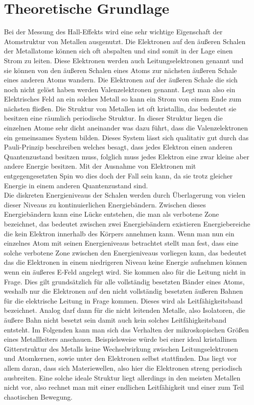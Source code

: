 \section{Theoretische Grundlage}
\label{sec:theo}
Bei der Messung des Hall-Effekts wird eine sehr wichtige Eigenschaft der Atomstruktur von Metallen ausgenutzt. %
Die Elektronen auf den äußeren Schalen der Metallatome können sich oft abspalten und sind somit in der Lage
einen Strom zu leiten. Diese Elektronen werden auch Leitungselektronen genannt und sie können von den äußeren Schalen
eines Atoms zur nächsten äußeren Schale eines anderen Atoms wandern. Die Elektronen auf der äußeren Schale die sich noch nicht gelöst haben werden Valenzelektronen
genannt. Legt man also ein Elektrisches Feld an ein solches Metall so kann ein Strom von einem Ende zum nächsten fließen.
Die Struktur von Metallen ist oft kristallin, das bedeutet sie besitzen eine räumlich periodische Struktur. In dieser Struktur liegen die einzelnen Atome sehr dicht aneinander 
was dazu führt, dass die Valenzelektronen ein gemeinsames System bilden. Dieses System lässt sich qualitativ gut durch das Pauli-Prinzip beschreiben welches besagt, dass
jedes Elektron einen anderen Quantenzustand besitzen muss, folglich muss jedes Elektron eine zwar kleine aber andere Energie besitzen. Mit der Ausnahme von Elektronen
mit entgegengesetzten Spin wo dies doch der Fall sein kann, da sie trotz gleicher Energie in einem anderen Quantenzustand sind. \\
Die diskreten Energieniveaus der Schalen werden durch Überlagerung von vielen dieser Niveaus zu kontinuierlichen Energiebändern. Zwischen dieses Energiebändern kann eine Lücke entstehen, die man 
als verbotene Zone bezeichnet, das bedeutet zwischen zwei Energiebändern existieren Energiebereiche die kein Elektron innerhalb des Körpers annehmen kann.
Wenn man nun ein einzelnes Atom mit seinen Energieniveaus betrachtet stellt man fest, dass eine solche verbotene Zone zwischen den Energieniveaus vorliegen kann, das bedeutet
das die Elektronen in einem niedrigeren Niveau keine Energie aufnehmen können wenn ein äußeres E-Feld angelegt wird. Sie kommen also für die Leitung nicht in Frage. 
Dies gilt grundsätzlich für alle vollständig besetzten Bänder eines Atoms, weshalb nur die Elektronen auf den nicht vollständig
besetzten äußeren Bahnen für die elektrische Leitung in Frage kommen. Dieses wird als Leitfähigkeitsband bezeichnet.
Analog darf dann für die nicht leitenden Metalle, also Isolatoren, die äußere Bahn nicht besetzt sein damit auch kein solches Leitfähigkeitsband entsteht.
Im Folgenden kann man sich das Verhalten der mikroskopischen Größen eines Metallleiters anschauen.
Beispielsweise würde bei einer ideal kristallinen Gitterstruktur des Metalls keine Wechselwirkung zwischen Leitungselektronen und Atomkernen, sowie unter den Elektronen
selbst stattfinden. Das liegt vor allem daran, dass sich Materiewellen, also hier die Elektronen streng periodisch ausbreiten. 
Eine solche ideale Struktur liegt allerdings in den meisten Metallen nicht vor, also rechnet man mit einer endlichen Leitfähigkeit und einer zum Teil chaotischen Bewegung.

